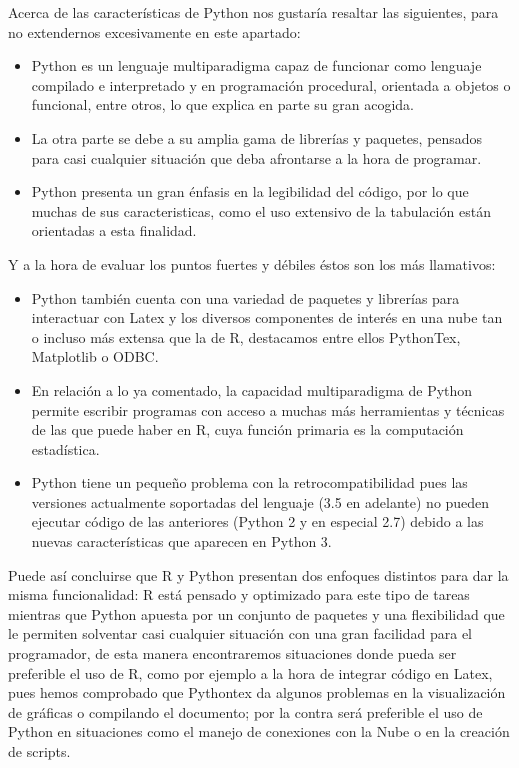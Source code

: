 \documentclass[11pt, a4paper]{article} %
\begin{document}
Acerca de las características de Python nos gustaría resaltar las siguientes, para no extendernos excesivamente en este apartado:
\begin{itemize}
\item Python es un lenguaje multiparadigma capaz de funcionar como lenguaje compilado e interpretado y en programación procedural, orientada a objetos o funcional, entre otros, lo que explica en parte su gran acogida.
\item La otra parte se debe a su amplia gama de librerías y paquetes, pensados para casi cualquier situación que deba afrontarse a la hora de programar.
\item Python presenta un gran énfasis en la legibilidad del código, por lo que muchas de sus caracteristicas, como el uso extensivo de la tabulación están orientadas a esta finalidad.
\end{itemize}
Y a la hora de evaluar los puntos fuertes y débiles éstos son los más llamativos:
\begin{itemize}
\item Python también cuenta con una variedad de paquetes y librerías para interactuar con Latex y los diversos componentes de interés en una nube tan o incluso más extensa que la de R, destacamos entre ellos PythonTex, Matplotlib o ODBC.
\item En relación a lo ya comentado, la capacidad multiparadigma de Python permite escribir programas con acceso a muchas más herramientas y técnicas de las que puede haber en R, cuya función primaria es la computación estadística.
\item Python tiene un pequeño problema con la retrocompatibilidad pues las  versiones actualmente soportadas del lenguaje (3.5 en adelante) no pueden ejecutar código de las anteriores (Python 2 y en especial 2.7) debido a las nuevas características que aparecen en Python 3.
\end{itemize}
Puede así concluirse que R y Python presentan dos enfoques distintos para dar la misma funcionalidad: R está pensado y optimizado para este tipo de tareas mientras que Python apuesta por un conjunto de paquetes y una flexibilidad que le permiten solventar casi cualquier situación con una gran facilidad para el programador, de esta manera encontraremos situaciones donde pueda ser preferible el uso de R, como por ejemplo a la hora de integrar código en Latex, pues hemos comprobado que Pythontex da algunos problemas en la visualización de gráficas o compilando el documento; por la contra será preferible el uso de Python en situaciones como el manejo de conexiones con la Nube o en la creación de scripts.
\end{document}
